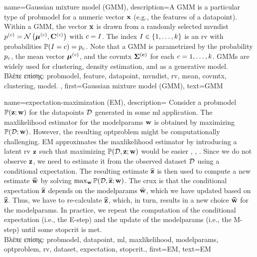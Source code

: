 {name={Gaussian mixture model (GMM)}, 
	description={A GMM 
		is a particular type of \gls{probmodel} for a numeric vector ${\bf x}$ (e.g., 
		the \gls{feature}s of a \gls{datapoint}). Within a GMM, the vector ${\bf x}$ is drawn from a randomly 
		selected \gls{mvndist} $p^{(c)} = \mathcal{N}\left({\bm \mu}^{(c)},\mathbf{C}^{(c)}\right)$ with 
		$c = I$. The index $I \in \{1, \ldots, k\}$ is an \gls{rv} with probabilities $\mathbb{P}({I=c}) = p_{c}$.
	     	Note that a GMM is parametrized by the \gls{probability} $p_{c}$, the 
		\gls{mean} vector ${\bm \mu}^{(c)}$, and the \gls{covmtx} $\bf\Sigma^{(c)}$ for each $c=1, \ldots, k$. 
		GMMs are widely used for \gls{clustering}, density estimation, and as a generative \gls{model}.\\
		\foreignlanguage{greek}{Βλέπε επίσης:} \gls{probmodel}, \gls{feature}, \gls{datapoint}, \gls{mvndist}, \gls{rv}, 
		\gls{mean}, \gls{covmtx}, \gls{clustering}, \gls{model}. },
	first={Gaussian mixture model (GMM)},
	text={GMM} 
}
	 
{name={expectation-maximization (EM)}, 
	description={ 
		Consider a \gls{probmodel} $\mathbb{P}({{\bf z}; {\bf w}})$ for the \gls{datapoint}s $\mathcal{D}$ generated in some 
		\gls{ml} application. The \gls{maxlikelihood} estimator for the \gls{modelparams} ${\bf w}$ is obtained by maximizing 
		$\mathbb{P}({\mathcal{D}; {\bf w}})$. However, the resulting \gls{optproblem} might be computationally 
		challenging. EM approximates the \gls{maxlikelihood} estimator by introducing a latent 
		\gls{rv} ${\bf z}$ such that maximizing $\mathbb{P}({\mathcal{D},{\bf z}; {\bf w}})$ would be 
		easier \cite{hastie01statisticallearning}, \cite{BishopBook}, \cite{GraphModExpFamVarInfWainJor}. Since we 
		do not observe ${\bf z}$, we need to estimate it from the observed \gls{dataset} $\mathcal{D}$ 
		using a conditional \gls{expectation}. The resulting estimate $\widehat{{\bf z}}$ is then used to 
		compute a new estimate $\widehat{{\bf w}}$ by solving $\max_{{\bf w}} \mathbb{P}({\mathcal{D}, \widehat{{\bf z}}; {\bf w}})$. 
		The crux is that the conditional \gls{expectation} $\widehat{{\bf z}}$ depends on the \gls{modelparams} $\widehat{{\bf w}}$, 
		which we have updated based on $\widehat{{\bf z}}$. Thus, we have to re-calculate $\widehat{{\bf z}}$, 
		which, in turn, results in a new choice $\widehat{{\bf w}}$ for the \gls{modelparams}. In practice, 
		we repeat the computation of the conditional \gls{expectation} (i.e., the E-step) and the update 
		of the \gls{modelparams} (i.e., the M-step) until some \gls{stopcrit} is met.\\
		\foreignlanguage{greek}{Βλέπε επίσης:} \gls{probmodel}, \gls{datapoint}, \gls{ml}, \gls{maxlikelihood}, \gls{modelparams}, 
		\gls{optproblem}, \gls{rv}, \gls{dataset}, \gls{expectation}, \gls{stopcrit}.},
	first={EM},
  	text={EM}
}

